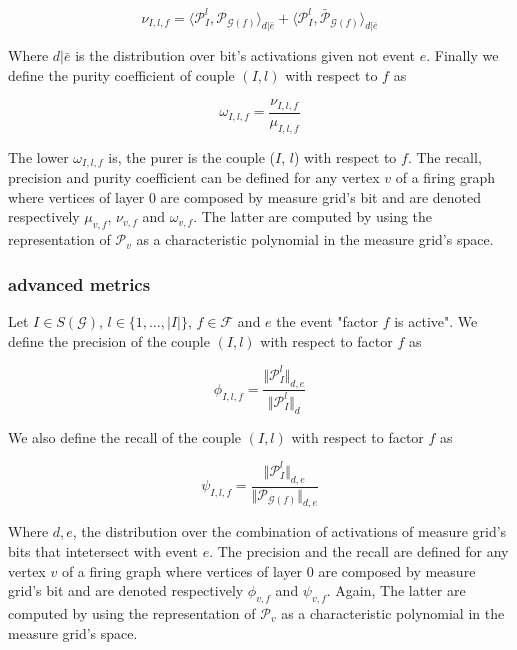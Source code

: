 \documentclass[a4paper, 11pt]{article}
\begin{document}
\begin{equation*}
\nu_{I, l, f} = \langle \mathcal{P}^{l}_{I}, \mathcal{P}_{\mathcal{G}(f)} \rangle_{d \vert \bar{e}} + \langle \mathcal{P}^{l}_{I}, \bar{\mathcal{P}}_{\mathcal{G}(f)} \rangle_{d \vert \bar{e}}
\end{equation*}

Where $d \vert \bar{e}$ is the  distribution over bit's activations given not event $e$. Finally we define the purity coefficient of couple $(I, l)$ with respect to $f$ as 

\begin{equation*}
\omega_{I, l, f} = \frac{\nu_{I, l, f}}{\mu_{I, l, f}}
\end{equation*}


The lower $\omega_{I, l, f}$ is, the purer is the couple ($I$, $l$) with respect to $f$. The recall, precision and purity coefficient can be defined for any vertex $v$ of a firing graph where vertices of layer 0 are composed by measure grid's bit and are denoted respectively $\mu_{v, f}$, $\nu_{v, f}$ and $\omega_{v, f}$. The latter are computed by using the representation of $\mathcal{P}_v$ as a characteristic polynomial in the measure grid's space.

\subsubsection*{advanced metrics}

 
Let $I \in S(\mathcal{G})$, $l \in \{ 1, \ldots, \vert I \vert \}$, $f \in \mathcal{F}$ and $e$ the event "factor $f$ is active". We define the precision of the couple $(I, l)$ with respect to factor $f$ as

\begin{equation*}
\phi_{I, l, f} = \frac{\Vert \mathcal{P}^{l}_I \Vert_{d, e}}{\Vert \mathcal{P}^{l}_I \Vert_{d}}
\end{equation*}

We also define the recall of the couple $(I, l)$ with respect to factor $f$ as

\begin{equation*}
\psi_{I, l, f} = \frac{\Vert \mathcal{P}^{l}_I \Vert_{d, e}}{\Vert \mathcal{P}_{\mathcal{G}(f)} \Vert_{d, e}}
\end{equation*}

Where $d, e$, the distribution over the combination of activations of measure grid's bits that intetersect with event $e$. The precision and the recall are defined for any vertex $v$ of a firing graph where vertices of layer 0 are composed by measure grid's bit and are denoted respectively $\phi_{v, f}$ and $\psi_{v, f}$. Again, The latter are computed by using the representation of $\mathcal{P}_v$ as a characteristic polynomial in the measure grid's space.
\end{document}
